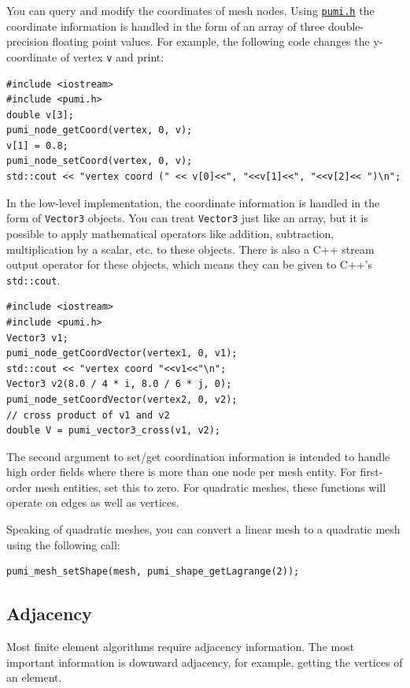 \documentclass{article}
\begin{document}
{You can query and modify the coordinates of mesh nodes.
Using \href{https://github.com/SCOREC/core/blob/master/pumi/pumi.h}
{\texttt{pumi.h}} the coordinate information is handled in the form of
an array of three double-precision floating point values.
For example, the following code changes the y-coordinate of vertex {\texttt{v}} and print:

\begin{lstlisting}
#include <iostream>
#include <pumi.h>
double v[3];
pumi_node_getCoord(vertex, 0, v);
v[1] = 0.8;
pumi_node_setCoord(vertex, 0, v);
std::cout << "vertex coord (" << v[0]<<", "<<v[1]<<", "<<v[2]<< ")\n";
\end{lstlisting}

In the low-level implementation, the coordinate information is handled in the form of \texttt{Vector3} 
objects.
You can treat \texttt{Vector3} just like an array, but it is
possible to apply mathematical operators like addition, subtraction,
multiplication by a scalar, etc. to these objects.
There is also a C++ stream output operator for these objects, which
means they can be given to C++'s \texttt{std::cout}.

\begin{lstlisting}
#include <iostream>
#include <pumi.h>
Vector3 v1;
pumi_node_getCoordVector(vertex1, 0, v1);
std::cout << "vertex coord "<<v1<<"\n";
Vector3 v2(8.0 / 4 * i, 8.0 / 6 * j, 0);
pumi_node_setCoordVector(vertex2, 0, v2);
// cross product of v1 and v2
double V = pumi_vector3_cross(v1, v2);
\end{lstlisting}

The second argument to set/get coordination information is intended to handle
high order fields where there is more than one node
per mesh entity.
For first-order mesh entities, set this to zero.
For quadratic meshes, these functions will operate on edges as well as vertices.

Speaking of quadratic meshes, you can convert a linear mesh
to a quadratic mesh using the following call:

\begin{lstlisting}
pumi_mesh_setShape(mesh, pumi_shape_getLagrange(2));
\end{lstlisting}

\subsection{Adjacency}

Most finite element algorithms require adjacency information.
The most important information is downward adjacency, for
example, getting the vertices of an element.

}
\end{document}
